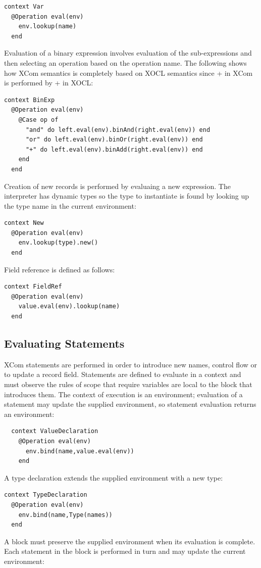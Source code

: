 \begin{lstlisting}
context Var
  @Operation eval(env)
    env.lookup(name)
  end
\end{lstlisting}Evaluation of a binary expression involves evaluation of the sub-expressions
and then selecting an operation based on the operation name. The following
shows how XCom semantics is completely based on XOCL semantics since
+ in XCom is performed by + in XOCL:

\begin{lstlisting}
context BinExp
  @Operation eval(env)
    @Case op of
      "and" do left.eval(env).binAnd(right.eval(env)) end
      "or" do left.eval(env).binOr(right.eval(env)) end
      "+" do left.eval(env).binAdd(right.eval(env)) end
    end
  end
\end{lstlisting}Creation of new records is performed by evaluaing a new expression.
The interpreter has dynamic types so the type to instantiate is found
by looking up the type name in the current environment:

\begin{lstlisting}
context New
  @Operation eval(env)
    env.lookup(type).new()
  end
\end{lstlisting}Field reference is defined as follows:

\begin{lstlisting}
context FieldRef
  @Operation eval(env)
    value.eval(env).lookup(name)
  end
\end{lstlisting}
\subsection{Evaluating Statements}

XCom statements are performed in order to introduce new names, control
flow or to update a record field. Statements are defined to evaluate
in a context and must observe the rules of scope that require variables
are local to the block that introduces them. The context of execution
is an environment; evaluation of a statement may update the supplied
environment, so statement evaluation returns an environment:

\begin{lstlisting}
  context ValueDeclaration
    @Operation eval(env)
      env.bind(name,value.eval(env))
    end
\end{lstlisting}A type declaration extends the supplied environment with a new type:

\begin{lstlisting}
context TypeDeclaration
  @Operation eval(env)
    env.bind(name,Type(names))
  end
\end{lstlisting}A block must preserve the supplied environment when its evaluation
is complete. Each statement in the block is performed in turn and
may update the current environment:

